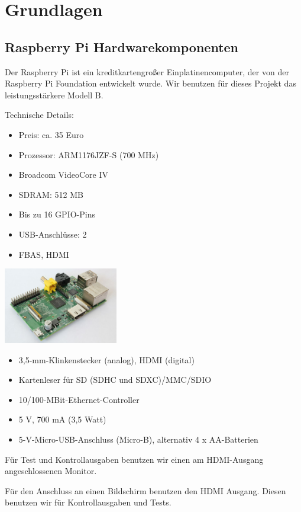 \documentclass[12pt]{article}
\begin{document}
\section{Grundlagen}

\subsection{Raspberry Pi Hardwarekomponenten}

Der Raspberry Pi ist ein kreditkartengroßer Einplatinencomputer, der von der Raspberry Pi Foundation entwickelt wurde.
Wir benutzen für dieses Projekt das leistungsstärkere Modell B.
\parbox{8cm}{
Technische Details:
\begin{itemize}
\item Preis: ca. 35 Euro
\item Prozessor: ARM1176JZF-S (700 MHz)
\item Broadcom VideoCore IV
\item SDRAM: 512 MB
\item Bis zu 16 GPIO-Pins
\item USB-Anschlüsse: 2
\item FBAS, HDMI
\end{itemize}
}
\hfill
\parbox{5cm}{
\includegraphics[width=5cm]{Raspi.jpg}
}
\begin{itemize}
\item 3,5-mm-Klinkenstecker (analog), HDMI (digital)
\item Kartenleser für SD (SDHC und SDXC)/MMC/SDIO
\item 10/100-MBit-Ethernet-Controller 
\item 5 V, 700 mA (3,5 Watt)
\item 5-V-Micro-USB-Anschluss (Micro-B), alternativ 4 x AA-Batterien
\end{itemize}

Für Test und Kontrollausgaben benutzen wir einen am HDMI-Ausgang angeschlossenen Monitor.

Für den Anschluss an einen Bildschirm benutzen den HDMI Ausgang.
Diesen benutzen wir für Kontrollausgaben und Tests.
\end{document}
